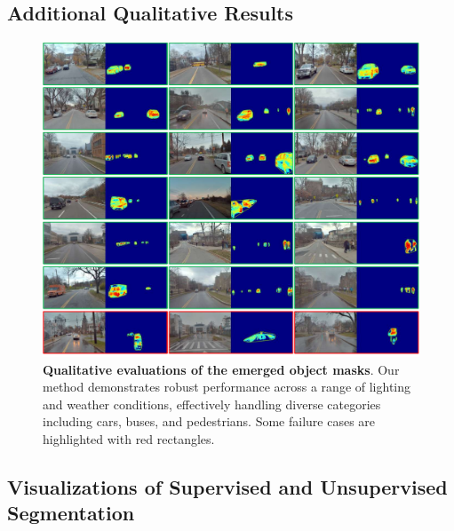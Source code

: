 \subsection{Additional Qualitative Results}
\label{subsec:add-quali-appendix}
\begin{figure}[ht]
\begin{center}
\centerline{\includegraphics[width=\columnwidth]{figs_compressed/featmask-supp_compressed.pdf}}
\caption{\textbf{Qualitative evaluations of the emerged object masks}. Our method demonstrates robust performance across a range of lighting and weather conditions, effectively handling diverse categories including cars, buses, and pedestrians. Some failure cases are highlighted with red rectangles. }
\label{fig:visseg-appendix}
\end{center}
\end{figure}


\clearpage

\subsection{Visualizations of Supervised and Unsupervised Segmentation}


